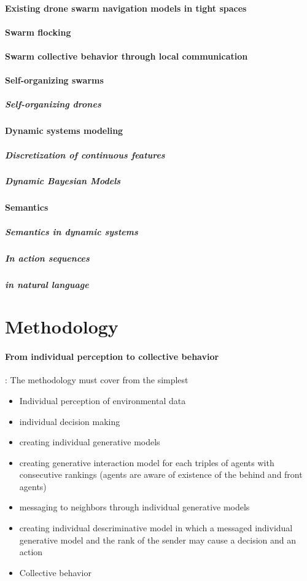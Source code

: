\documentclass{article}
\begin{document}
		\paragraph{Existing drone swarm navigation models in tight spaces}
			\cite{soria-2020-swarmlab-a-matlab-drone-swarm-simulator}
		\paragraph{Swarm flocking}
			\cite{vasarhelyi-2014-outdoor-flocking-and-formation-flight-with-autonomous-aerial-robots}
		\paragraph{Swarm collective behavior through local communication}
		\paragraph{Self-organizing swarms}
			\subparagraph{Self-organizing drones}
		\paragraph{Dynamic systems modeling}
			\subparagraph{Discretization of continuous features}
			\subparagraph{Dynamic Bayesian Models}
		
		\paragraph{Semantics}
			\subparagraph{Semantics in dynamic systems}	
			\subparagraph{In action sequences}
			\subparagraph{in natural language}
		
	\section{Methodology}
		\paragraph{From individual perception to collective behavior}: The methodology must cover from the simplest  
			\begin{itemize}
				\item Individual perception of environmental data
				\item individual decision making
				\item creating individual generative models
				\item creating generative interaction model for each triples of agents with consecutive rankings (agents are aware of existence of the behind and front agents)
				\item messaging to neighbors through individual generative models
				\item creating individual descriminative model in which a messaged individual generative model and the rank of the sender may cause a decision and an action 
				\item Collective behavior 
			\end{itemize}
	
\end{document}
